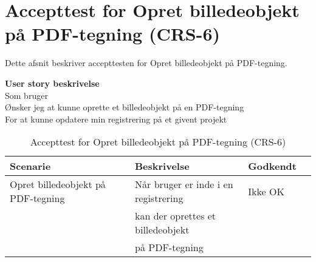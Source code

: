 \section{Accepttest for Opret billedeobjekt på PDF-tegning (CRS-6)}
Dette afsnit beskriver accepttesten for Opret billedeobjekt på PDF-tegning.

\textbf{User story beskrivelse} \\
Som bruger \\
Ønsker jeg at kunne oprette et billedeobjekt på en PDF-tegning \\
For at kunne opdatere min registrering på et givent projekt

\begin{table}[H]
	\centering
	\begin{tabular}{|ll|l|ll|} \hline
		\textbf{Scenarie} &  & \textbf{Beskrivelse}&  \textbf{Godkendt}&  \\ \hline
		Opret billedeobjekt på PDF-tegning&  &  Når bruger er inde i en registrering &  Ikke OK&  \\
		& & kan der oprettes et billedeobjekt& & \\ 
		& & på PDF-tegning& & \\ \hline
	\end{tabular}
	\caption{Accepttest for Opret billedeobjekt på PDF-tegning (CRS-6)}
	\label{AcceptBillede}
\end{table}

\clearpage